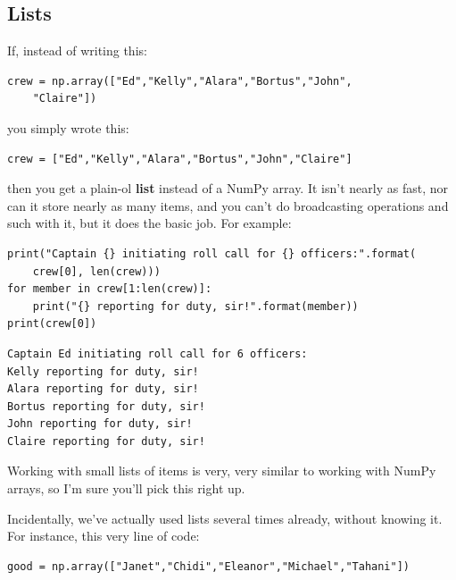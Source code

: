 \subsection{Lists}

\smallskip
If, instead of writing this:

\begin{Verbatim}[fontsize=\small,samepage=true,frame=single,framesep=3mm]
crew = np.array(["Ed","Kelly","Alara","Bortus","John",
    "Claire"])
\end{Verbatim}

you simply wrote this:

\begin{Verbatim}[fontsize=\small,samepage=true,frame=single,framesep=3mm]
crew = ["Ed","Kelly","Alara","Bortus","John","Claire"]
\end{Verbatim}


then you get a plain-ol \textbf{list} instead of a NumPy array. It isn't nearly
as fast, nor can it store nearly as many items, and you can't do broadcasting
operations and such with it, but it does the basic job. For example:


\begin{Verbatim}[fontsize=\footnotesize,samepage=true,frame=single,framesep=3mm]
print("Captain {} initiating roll call for {} officers:".format(
    crew[0], len(crew)))
for member in crew[1:len(crew)]:
    print("{} reporting for duty, sir!".format(member))
print(crew[0])
\end{Verbatim}

\vspace{-.2in}

\begin{Verbatim}[fontsize=\small,samepage=true,frame=leftline,framesep=5mm,framerule=1mm]
Captain Ed initiating roll call for 6 officers:
Kelly reporting for duty, sir!
Alara reporting for duty, sir!
Bortus reporting for duty, sir!
John reporting for duty, sir!
Claire reporting for duty, sir!
\end{Verbatim}

Working with small lists of items is very, very similar to working with NumPy
arrays, so I'm sure you'll pick this right up.

Incidentally, we've actually used lists several times already, without knowing
it. For instance, this very line of code:

\begin{Verbatim}[fontsize=\footnotesize,samepage=true,frame=single,framesep=3mm]
good = np.array(["Janet","Chidi","Eleanor","Michael","Tahani"])
\end{Verbatim}

